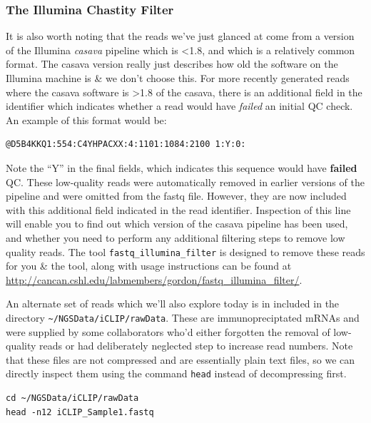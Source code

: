 \subsubsection{The Illumina Chastity Filter}
\begin{information}
It is also worth noting that the reads we've just glanced at come from a version of the Illumina \textit{casava} pipeline which is \textless 1.8, and which is a relatively common format.
The casava version really just describes how old the software on the Illumina machine is \& we don't choose this.
For more recently generated reads where the casava software is \textgreater 1.8 of the casava, there is an additional field in the identifier which indicates whether a read would have \textit{failed} an initial QC check. 
An example of this format would be:
\begin{lstlisting}
@D5B4KKQ1:554:C4YHPACXX:4:1101:1084:2100 1:Y:0:
\end{lstlisting}
Note the ``Y'' in the final fields, which indicates this sequence would have \textbf{failed} QC.
These low-quality reads were automatically removed in earlier versions of the pipeline and were omitted from the fastq file.
However, they are now included with this additional field indicated in the read identifier.
Inspection of this line will enable you to find out which version of the casava pipeline has been used, and whether you need to perform any additional filtering steps to remove low quality reads. 
The tool \texttt{fastq\_illumina\_filter} is designed to remove these reads for you \& the tool, along with usage instructions can be found at \url{http://cancan.cshl.edu/labmembers/gordon/fastq\_illumina\_filter/}.\\
\end{information}

\begin{steps}
An alternate set of reads which we'll also explore today is in included in the directory \texttt{\~{}/NGSData/iCLIP/rawData}.
These are immunopreciptated mRNAs and were supplied by some collaborators who'd either forgotten the removal of low-quality reads or had deliberately neglected step to increase read numbers.
Note that these files are not compressed and are essentially plain text files, so we can directly inspect them using the command \texttt{head} instead of decompressing first.\\
\end{steps}

\begin{lstlisting}
cd ~/NGSData/iCLIP/rawData
head -n12 iCLIP_Sample1.fastq
\end{lstlisting}

